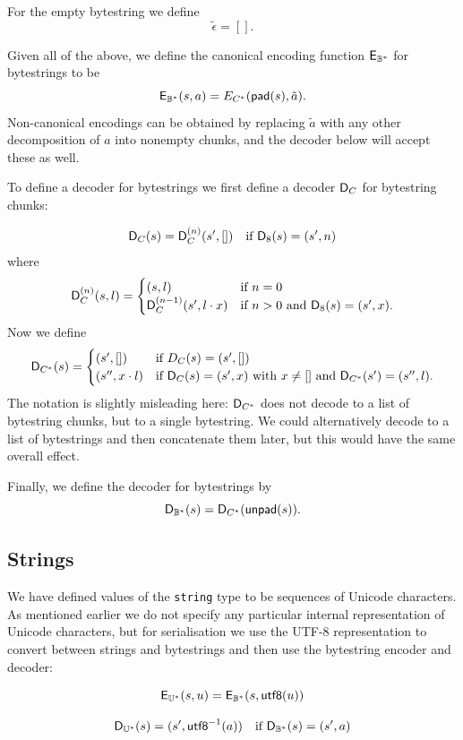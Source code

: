 \smallskip
\noindent For the empty bytestring we define
$$
\tilde{\epsilon} = [].
$$

\medskip
\noindent Given all of the above, we define the canonical encoding function
$\mathsf{E}_{\mathbb{B}^*}$ for bytestrings to be
$$
\mathsf{E}_{\mathbb{B}^*}(s, a) = E_{C^*}(\mathsf{pad}(s), \tilde{a}).
$$
\noindent Non-canonical encodings can be obtained by replacing $\tilde{a}$ with any
other decomposition of $a$ into nonempty chunks, and the decoder below will
accept these as well.

\bigskip

\noindent To define a decoder for bytestrings we first define a decoder
$\mathsf{D}_{C}$ for bytestring chunks:

$$
\mathsf{D}_{C}(s) = \mathsf{D}_C^{(n)}(s',[]) \quad \text{if $\mathsf{D}_8(s) = (s', n)$}
$$
where
$$
\mathsf{D}^{(n)}_C (s, l) =
\begin{cases}
  (s, l) & \text{if $n=0$}\\
  \mathsf{D}^{(n-1)}_C (s',l\cdot x)  & \text{if $n > 0$ and $\mathsf{D}_8(s) = (s',x)$.}
\end{cases}
$$
Now we define
$$
\mathsf{D}_{C^*}(s) =
\begin{cases}
  (s', []) & \text{if $D_C(s) = (s', [])$}\\
  (s'', x \cdot l) & \text{if $\mathsf{D}_C(s) = (s', x)$ with $x \ne []$ and $\mathsf{D}_{C^*}(s') = (s'', l)$}.
\end{cases}
$$
\noindent The notation is slightly misleading here: $\mathsf{D}_{C^*}$ does not
decode to a list of bytestring chunks, but to a single bytestring.  We
could alternatively decode to a list of bytestrings and then concatenate them
later, but this would have the same overall effect.

\medskip
\noindent Finally, we define the decoder for bytestrings by
$$
\mathsf{D}_{\mathbb{B}^*} (s) = \mathsf{D}_{C^*}(\mathsf{unpad}(s)).
$$

\subsection{Strings}
We have defined values of the \texttt{string} type to be sequences of Unicode
characters.  As mentioned earlier we do not specify any particular internal
representation of Unicode characters, but for serialisation we use the UTF-8
representation to convert between strings and bytestrings and then use the
bytestring encoder and decoder:

$$
\mathsf{E}_{\mathbb{U}^*}(s,u) = \mathsf{E}_{\mathbb{B}^*}(s,\mathsf{utf8}(u))
$$

$$
\mathsf{D}_{\mathbb{U}^*}(s) = (s', \mathsf{utf8}^{-1}(a)) \quad \text{if $\mathsf{D}_{\mathbb{B}^*}(s) = (s', a)$}
$$


